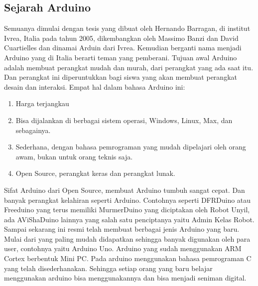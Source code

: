\subsection{Sejarah Arduino}
Semuanya dimulai dengan tesis yang dibuat oleh Hernando Barragan, di institut Ivrea, Italia pada tahun 2005, dikembangkan oleh Massimo Banzi dan David Cuartielles dan dinamai Arduin dari Ivrea. Kemudian berganti nama menjadi Arduino yang di Italia berarti teman yang pemberani.
Tujuan awal Arduino adalah membuat perangkat mudah dan murah, dari perangkat yang ada saat itu. Dan perangkat ini diperuntukkan bagi siswa yang akan membuat perangkat desain dan interaksi.
Empat hal dalam bahasa Arduino ini:
\begin{enumerate}
\item Harga terjangkau
\item Bisa dijalankan di berbagai sistem operasi, Windows, Linux, Max, dan sebagainya.
\item Sederhana, dengan bahasa pemrograman yang mudah dipelajari oleh orang awam, bukan untuk orang teknis saja.
\item Open Source, perangkat keras dan perangkat lunak.
\end{enumerate}
Sifat Arduino dari Open Source, membuat Arduino tumbuh sangat cepat. Dan banyak perangkat kelahiran seperti Arduino. Contohnya seperti DFRDuino atau Freeduino yang terus memiliki MurmerDuino yang diciptakan oleh Robot Unyil, ada AViShaDuino lainnya yang salah satu penciptanya yaitu Admin Kelas Robot.
Sampai sekarang ini resmi telah membuat berbagai jenis Arduino yang baru. Mulai dari yang paling mudah didapatkan sehingga banyak digunakan oleh para user, contohnya yaitu Arduino Uno. Arduino yang sudah menggunakan ARM Cortex berbentuk Mini PC. Pada arduino menggunakan bahasa pemrograman C yang telah disederhanakan. Sehingga setiap orang yang baru belajar menggunakan arduino bisa menggunakannya dan bisa menjadi seniman digital.

